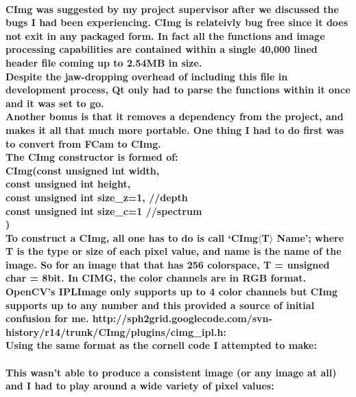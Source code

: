 \paragraph{CImg was suggested by my project supervisor after we discussed the bugs I had been experiencing. CImg is relateivly bug free since it does not exit in any packaged form. In fact all the functions and image processing capabilities are contained within a single 40,000 lined header file coming up to 2.54MB in size. \\Despite the jaw-dropping overhead of including this file in development process, Qt only had to parse the functions within it once and it was set to go.
\\Another bonus is that it removes a dependency from the project, and makes it all that much more portable. One thing I had to do first was to convert from FCam to CImg.
\\The CImg constructor is formed of:\\
CImg(const unsigned int width,\\
\tab const unsigned int height,\\
\tab const unsigned int size\_z=1, //depth\\
\tab const unsigned int size\_c=1 //spectrum\\
)\\
To construct a CImg, all one has to do is call ‘CImg\(\langle\)T\(\rangle\) Name’; where T is the type or size of each pixel value, and name is the name of the image. So for an image that that has 256 colorspace, T = unsigned char = 8bit.
In CIMG, the color channels are in RGB format. OpenCV's IPLImage only supports up to 4 color channels but CImg supports up to any number and this provided a source of initial confusion for me.
http://sph2grid.googlecode.com/svn-history/r14/trunk/CImg/plugins/cimg\_ipl.h:\\
Using the same format as the cornell code I attempted to make:}
\begin{frame}[fragile]

\end{frame}
\paragraph{This wasn't able to produce a consistent image (or any image at all) and I had to play around a wide variety of pixel values:}
\begin{frame}[fragile]

\end{frame}
